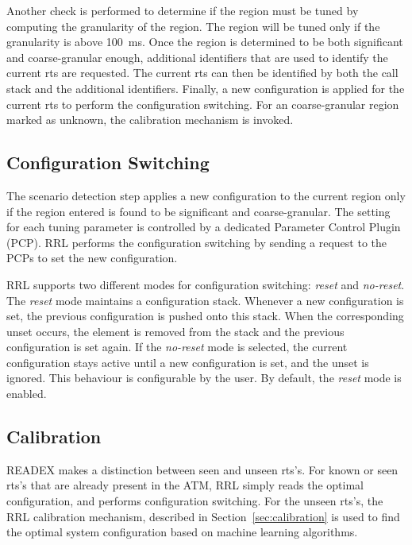 Another check is performed to determine if the region must be tuned by computing the granularity of the region. The region will be tuned only if the granularity is above 100~ms. Once the region is determined to be both significant and coarse-granular enough, additional identifiers that are used to identify the current rts are requested. The current rts can then be identified by both the call stack and the additional identifiers. Finally, a new configuration is applied for the current rts to perform the configuration switching.
For an coarse-granular region marked as unknown, the calibration mechanism is invoked.

\subsection{Configuration Switching}\label{config-switching}
The scenario detection step applies a new configuration to the current region only if the region entered is found to be significant and coarse-granular. The setting for each tuning parameter is controlled by a dedicated Parameter Control Plugin (PCP). RRL performs the configuration switching by sending a request to the PCPs to set the new configuration. 

RRL supports two different modes for configuration switching: \textit{reset} and \textit{no-reset}. The \textit{reset} mode maintains a configuration stack. Whenever a new configuration is set, the previous configuration is pushed onto this stack. When the corresponding unset occurs, the element is removed from the stack and the previous configuration is set again. If the \textit{no-reset} mode is selected, the current configuration stays active until a new configuration is set, and the unset is ignored. This behaviour is configurable by the user. By default, the \textit{reset} mode is enabled.

\subsection{Calibration}\label{calibr}
READEX makes a distinction between seen and unseen rts's. For known or seen rts's that are already present in the ATM, RRL simply reads the optimal configuration, and performs configuration switching. For the unseen rts's, the RRL calibration mechanism, described in Section~\ref{sec:calibration} is used to find the optimal system configuration based on machine learning algorithms.

 

 